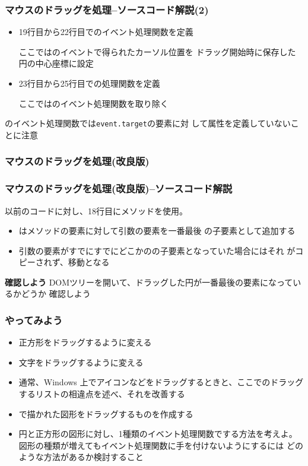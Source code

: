 \begin{frame}
 \frametitle{マウスのドラッグを処理--ソースコード解説(2)}
\begin{itemize}
\item 19行目から22行目でのイベント処理関数を定義

      ここではのイベントで得られたカーソル位置を
      ドラッグ開始時に保存した円の中心座標に設定
 \item 23行目から25行目での処理関数を定義

       ここではのイベント処理関数を取り除く
\end{itemize}

 のイベント処理関数では\texttt{event.target}の要素に対
 して属性を定義していないことに注意
\end{frame}
\begin{frame}[containsverbatim]
 \frametitle{マウスのドラッグを処理(改良版)}
\end{frame}
\begin{frame}[containsverbatim]
 \frametitle{マウスのドラッグを処理(改良版)--ソースコード解説}
以前のコードに対し、18行目にメソッドを使用。
 \begin{itemize}
  \item {}はメソッドの要素に対して引数の要素を一番最後
        の子要素として追加する
  \item 引数の要素がすでにすでにどこかのの子要素となっていた場合にはそれ
        がコピーされず、移動となる
 \end{itemize}
 {\bfseries 確認しよう}
 DOMツリーを開いて、ドラッグした円が一番最後の要素になっているかどうか
 確認しよう
\end{frame}
\begin{frame}[containsverbatim]
 \frametitle{やってみよう}
\begin{itemize}
 \item 正方形をドラッグするように変える
 \item 文字をドラッグするように変える
 \item 通常、Windows 上でアイコンなどをドラッグするときと、ここでのドラッグするリストの相違点を述べ、それを改善する
 \item {}で描かれた図形をドラッグするものを作成する
 \item 円と正方形の図形に対し、1種類のイベント処理関数でする方法を考えよ。
			 図形の種類が増えてもイベント処理関数に手を付けないようにするには
			 どのような方法があるか検討すること
\end{itemize}
\end{frame}

\begin{frame}[containsverbatim]
 \frametitle{}
\end{frame}
